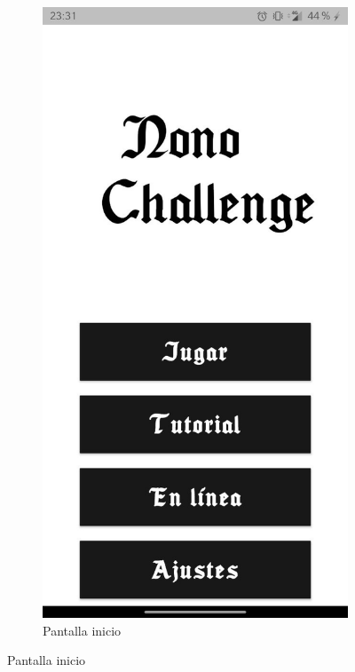 \begin{figure}[H]
    \centering
    \begin{subfigure}[b]{0.36\linewidth}
      \includegraphics[width=\linewidth]{images/man1.jpeg}
      \caption{Pantalla inicio}
      \label{fig:man1-1}

\end{subfigure}
\end{figure}
